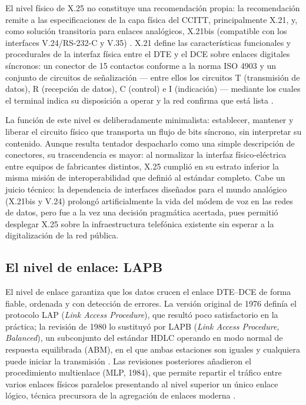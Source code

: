 \documentclass[12pt,a4paper]{article}
\begin{document}
El nivel físico de X.25 no constituye una recomendación propia: la recomendación remite a las especificaciones de la capa física del CCITT, principalmente X.21, y, como solución transitoria para enlaces analógicos, X.21bis (compatible con los interfaces V.24/RS-232-C y V.35) \cite{itux25, stallings2004}. X.21 define las características funcionales y procedurales de la interfaz física entre el DTE y el DCE sobre enlaces digitales síncronos: un conector de 15 contactos conforme a la norma ISO 4903 y un conjunto de circuitos de señalización --- entre ellos los circuitos T (transmisión de datos), R (recepción de datos), C (control) e I (indicación) --- mediante los cuales el terminal indica su disposición a operar y la red confirma que está lista \cite{schwartz1987}.

La función de este nivel es deliberadamente minimalista: establecer, mantener y liberar el circuito físico que transporta un flujo de bits síncrono, sin interpretar su contenido. Aunque resulta tentador despacharlo como una simple descripción de conectores, su trascendencia es mayor: al normalizar la interfaz físico-eléctrica entre equipos de fabricantes distintos, X.25 cumplió en su estrato inferior la misma misión de interoperabilidad que definió al estándar completo. Cabe un juicio técnico: la dependencia de interfaces diseñados para el mundo analógico (X.21bis y V.24) prolongó artificialmente la vida del módem de voz en las redes de datos, pero fue a la vez una decisión pragmática acertada, pues permitió desplegar X.25 sobre la infraestructura telefónica existente sin esperar a la digitalización de la red pública.

\subsection{El nivel de enlace: LAPB}

El nivel de enlace garantiza que los datos crucen el enlace DTE--DCE de forma fiable, ordenada y con detección de errores. La versión original de 1976 definía el protocolo LAP (\emph{Link Access Procedure}), que resultó poco satisfactorio en la práctica; la revisión de 1980 lo sustituyó por LAPB (\emph{Link Access Procedure, Balanced}), un subconjunto del estándar HDLC operando en modo normal de respuesta equilibrada (ABM), en el que ambas estaciones son iguales y cualquiera puede iniciar la transmisión \cite{itux25, tanenbaum2012}. Las revisiones posteriores añadieron el procedimiento multienlace (MLP, 1984), que permite repartir el tráfico entre varios enlaces físicos paralelos presentando al nivel superior un único enlace lógico, técnica precursora de la agregación de enlaces moderna \cite{stallings2004}.
\end{document}
